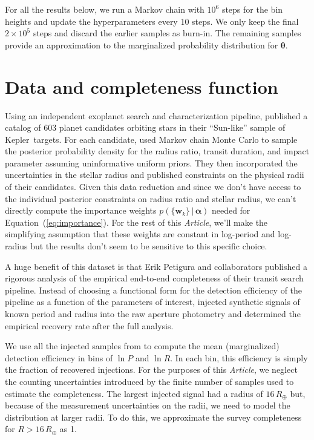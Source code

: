 \documentclass[12pt,preprint]{aastex}
\newcommand{\project}[1]{{\sffamily #1}}
\newcommand{\kepler}{\project{Kepler}}
\newcommand{\paper}{\textsl{Article}}
\newcommand{\Eq}[1]{Equation~(\ref{eq:#1})}
\newcommand{\eq}[1]{\Eq{#1}}
\newcommand{\sectlabel}[1]{\label{sect:#1}}
\newcommand{\bvec}[1]{\ensuremath{\boldsymbol{#1}}}
\newcommand{\ratepar}{{\ensuremath{\theta}}}
\newcommand{\ratepars}{{\ensuremath{\bvec{\ratepar}}}}
\newcommand{\radius}{\ensuremath{R}}
\newcommand{\period}{\ensuremath{P}}
\newcommand{\entry}{{\ensuremath{\bvec{w}}}}
\newcommand{\interim}{{\ensuremath{\bvec{\alpha}}}}
\begin{document}
For all the results below, we run a Markov chain with $10^6$ steps for the bin
heights and update the hyperparameters every 10 steps.
We only keep the final $2 \times 10^5$ steps and discard the earlier samples
as burn-in.
The remaining samples provide an approximation to the marginalized probability
distribution for \ratepars.

\section{Data and completeness function}
\sectlabel{data}

Using an independent exoplanet search and characterization pipeline,
\citet{petigura} published a catalog of 603 planet candidates orbiting stars
in their ``Sun-like'' sample of \kepler\ targets.
For each candidate, \citet{petigura} used Markov chain Monte Carlo to sample
the posterior probability density for the radius ratio, transit duration, and
impact parameter assuming uninformative uniform priors.
They then incorporated the uncertainties in the stellar radius and published
constraints on the physical radii of their candidates.
Given this data reduction and since we don't have access to the individual
posterior constraints on radius ratio and stellar radius, we can't directly
compute the importance weights $p(\{\entry_k\}\,|\,\interim)$ needed for
\eq{importance}.
For the rest of this \paper, we'll make the simplifying assumption that these
weights are constant in log-period and log-radius but the results don't seem
to be sensitive to this specific choice.

A huge benefit of this dataset is that Erik Petigura and collaborators
published a rigorous analysis of the empirical end-to-end completeness of
their transit search pipeline.
Instead of choosing a functional form for the detection efficiency of the
pipeline as a function of the parameters of interest, \citet{petigura}
injected synthetic signals of known period and radius into the raw aperture
photometry and determined the empirical recovery rate after the full analysis.

We use all the injected samples from \citet{petigura} to compute the mean
(marginalized) detection efficiency in bins of $\ln\period$ and $\ln\radius$.
In each bin, this efficiency is simply the fraction of recovered injections.
For the purposes of this \paper, we neglect the counting uncertainties
introduced by the finite number of samples used to estimate the completeness.
The largest injected signal had a radius of $16\,R_\oplus$ but, because of the
measurement uncertainties on the radii, we need to model the distribution at
larger radii.
To do this, we approximate the survey completeness for $\radius>16\,R_\oplus$
as 1.
\end{document}
